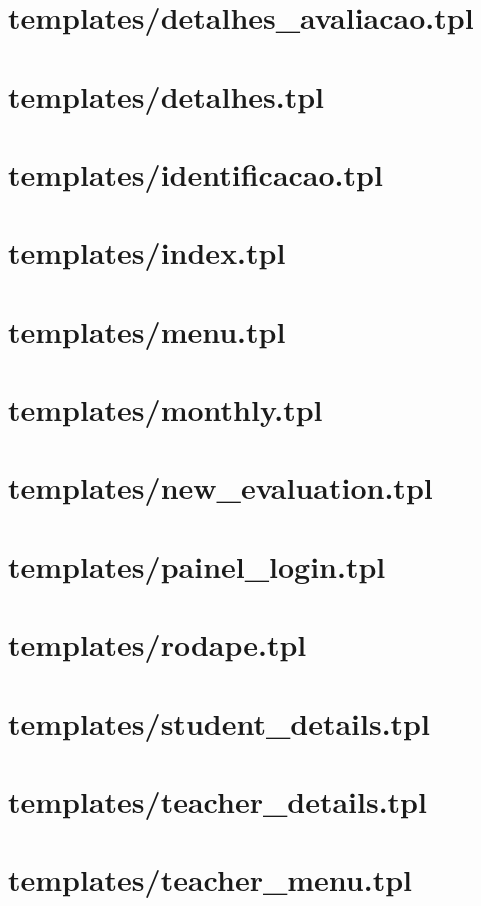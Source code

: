 \section{templates/detalhes\_avaliacao.tpl}

\section{templates/detalhes.tpl}

\section{templates/identificacao.tpl}

\section{templates/index.tpl}

\section{templates/menu.tpl}

\section{templates/monthly.tpl}

\section{templates/new\_evaluation.tpl}

\section{templates/painel\_login.tpl}

\section{templates/rodape.tpl}

\section{templates/student\_details.tpl}

\section{templates/teacher\_details.tpl}

\section{templates/teacher\_menu.tpl}


